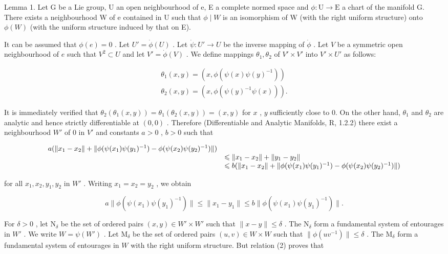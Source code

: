 Lemma 1. Let G be a Lie group, U an open neighbourhood of e, E a complete normed space and \(\phi: \mathrm{U} \to \mathrm{E}\) a chart of the manifold G. There exists a neighbourhood W of e contained in U such that \(\phi \mid W\) is an isomorphism of W (with the right uniform structure) onto \(\phi(W)\) (with the uniform structure induced by that on E).

It can be assumed that \(\phi(e) = 0\) . Let \(U' = \dot{\phi}(U)\) . Let \(\dot{\psi}: U' \to U\) be the inverse mapping of \(\dot{\phi}\) . Let \(V\) be a symmetric open neighbourhood of \(e\) such that \(V^2 \subset U\) and let \(V' = \dot{\phi}(V)\) . We define mappings \(\theta_1, \theta_2\) of \(V' \times V'\) into \(V' \times U'\) as follows:

\[
\begin{array}{l} \theta_ {1} (x, y) = (x, \phi (\psi (x) \psi (y) ^ {- 1})) \\ \theta_ {2} (x, y) = (x, \phi (\psi (y) ^ {- 1} \psi (x))). \end{array}
\]

It is immediately verified that \(\theta_{2}(\theta_{1}(x,y)) = \theta_{1}(\theta_{2}(x,y)) = (x,y)\) for \(x\) , \(y\) sufficiently close to 0. On the other hand, \(\theta_{1}\) and \(\theta_{2}\) are analytic and hence strictly differentiable at \((0,0)\) . Therefore (Differentiable and Analytic Manifolds, R, 1.2.2) there exist a neighbourhood \(W'\) of 0 in \(V'\) and constants \(a > 0\) , \(b > 0\) such that

\[
\begin{array}{r l} a (\| x _ {1} - x _ {2} \| + \| \phi (\psi (x _ {1}) \psi (y _ {1}) ^ {- 1}) - \phi (\psi (x _ {2}) \psi (y _ {2}) ^ {- 1}) \|) \\ & \leqslant \| x _ {1} - x _ {2} \| + \| y _ {1} - y _ {2} \| \\ & \leqslant b (\| x _ {1} - x _ {2} \| + \| \phi (\psi (x _ {1}) \psi (y _ {1}) ^ {- 1}) - \phi (\psi (x _ {2}) \psi (y _ {2}) ^ {- 1}) \|) \end{array}
\]

for all \(x_1, x_2, y_1, y_2\) in \(W'\) . Writing \(x_1 = x_2 = y_2\) , we obtain

\[
a \| \phi (\psi (x _ {1}) \psi (y _ {1}) ^ {- 1}) \| \leqslant \| x _ {1} - y _ {1} \| \leqslant b \| \phi (\psi (x _ {1}) \psi (y _ {1}) ^ {- 1}) \|.\tag{2}
\]

For \(\delta > 0\) , let \(\mathrm{N}_{\delta}\) be the set of ordered pairs \((x,y)\in W'\times W'\) such that \(\| x - y\| \leqslant \delta\) . The \(\mathrm{N}_{\delta}\) form a fundamental system of entourages in \(W'\) . We write \(W = \psi(W')\) . Let \(\mathrm{M}_{\delta}\) be the set of ordered pairs \((u,v)\in W\times W\) such that \(\| \phi (u v^{-1})\| \leqslant \delta\) . The \(\mathrm{M}_{\delta}\) form a fundamental system of entourages in \(W\) with the right uniform structure. But relation (2) proves that


